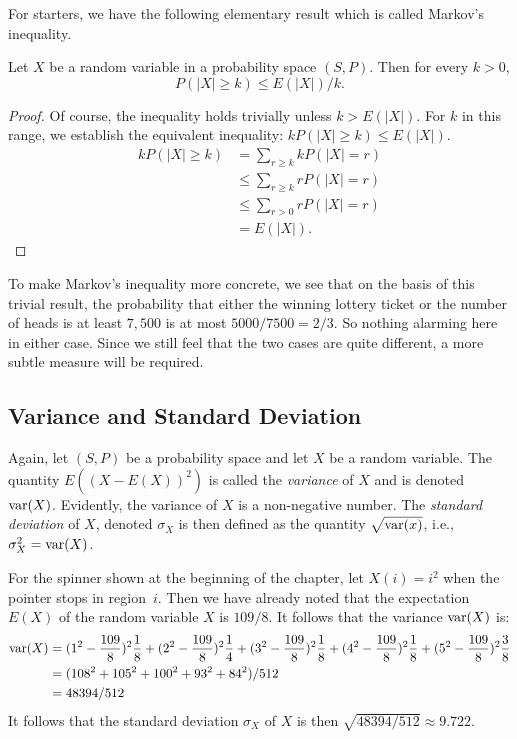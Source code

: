 For starters, we have the following elementary result which is
called Markov's inequality.

\begin{theorem}\label{thm:markov}
Let $X$ be a random variable in a probability
space $(S,P)$.  Then for every $k>0$,
\[
P(|X|\ge k) \le E(|X|)/k.
\]
\end{theorem}
\begin{proof}
Of course, the inequality holds trivially unless
$k> E(|X|)$.  For $k$ in this range, we
establish the equivalent inequality: $k P(|X|\ge k)\le E(|X|)$.
\begin{align*}
k P(|X|\ge k) &   = \sum_{r\ge k} k P(|X|=r)\\
              & \le \sum_{r \ge k} r P(|X|=r)\\
              & \le \sum_{r> 0} r P(|X|=r)\\
              &= E(|X|).
\end{align*}
\end{proof}

To make Markov's inequality more concrete, we see that on the
basis of this trivial  result, the probability that either the
winning lottery ticket or the number of heads is at least $7,500$
is at most $5000/7500=2/3$.  So nothing alarming here in either
case.  Since we still feel that the two cases are quite different,
a more subtle measure will be required.

\subsection{Variance and Standard Deviation}

Again, let $(S,P)$ be a probability space and let $X$ be a random variable.
The quantity $E((X-E(X))^2)$ is called the \textit{variance} of $X$ and
is denoted $\operatorname{var}(X)$.  Evidently, the variance of $X$ is a non-negative
number.  The \textit{standard deviation} of $X$, denoted $\sigma_X$ is then
defined as the quantity $\sqrt{\operatorname{var}(x)}$, i.e., $\sigma_X^2 =\operatorname{var}(X)$.

\begin{example}
For the spinner shown at the beginning of the chapter, let $X(i)=i^2$ when
the pointer stops in region~$i$.  Then we have already noted that the
expectation $E(X)$ of the random variable $X$ is $109/8$.  It follows that
the variance $\operatorname{var}(X)$ is:
\begin{align*}
\operatorname{var}(X)&=(1^2-\frac{109}{8})^2\frac{1}{8}+(2^2-\frac{109}{8})^2\frac{1}{4}+
          (3^2-\frac{109}{8})^2\frac{1}{8}+(4^2-\frac{109}{8})^2\frac{1}{8}+
          (5^2-\frac{109}{8})^2\frac{3}{8}\\
       &=(108^2+105^2+100^2+93^2+84^2)/512\\
       &=48394/512
\end{align*}
It follows that the standard deviation $\sigma_X$ of $X$ is then
$\sqrt{48394/512}\approx 9.722$.
\end{example}

